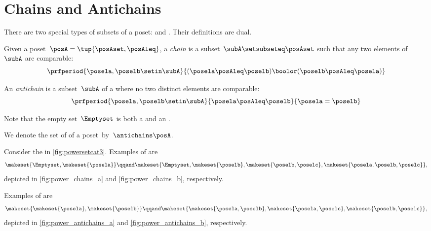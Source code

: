 
\section{Chains and Antichains}
\label{sec:chains-antichains}

There are two special types of subsets of a poset:  and .
Their definitions are dual.

\begin{definition}
    \label{def:chain}
    Given a poset~$\posA = \tup{\posAset, \posAleq}$, a \emph{chain} is a subset~$\subA \setsubseteq \posAset$ such that any two elements of~$\subA$ are comparable:
    \begin{equation}\label{eq:chain}
        \prfperiod{
            \posela,\poselb \setin \subA
        }{
            (\posela \posAleq  \poselb) \boolor (\poselb \posAleq  \posela)
        }
    \end{equation}
\end{definition}

\begin{definition}
    \label{def:antichain}
    An \emph{antichain} is a subset~$\subA$ of a  where no two distinct elements are comparable:
    \begin{equation}\label{eq:antichain}
        \prfperiod{
            \posela, \poselb \setin \subA
        }{
            \posela \posAleq \poselb
        }{
            \posela = \poselb
        }
    \end{equation}
\end{definition}
\begin{remark}
    Note that the empty set~$\Emptyset$ is both a  and an .
\end{remark}

We denote the set of  of a poset~\posA by~$\antichains\posA$.

\begin{example}
    Consider the  in \cref{fig:powersetcat3}.
    Examples of  are
    \begin{equation}\label{eq:example-chain}
        \makeset{\Emptyset,\makeset{\posela}}
        \qqand
        \makeset{\Emptyset,\makeset{\poselb},\makeset{\poselb,\poselc},\makeset{\posela,\poselb,\poselc}},
    \end{equation}
    depicted in \cref{fig:power_chains_a} and \cref{fig:power_chains_b}, respectively.

    Examples of  are
    \begin{equation}\label{eq:examples-antichain}
        \makeset{\makeset{\posela},\makeset{\poselb}}
        \qqand
        \makeset{\makeset{\posela,\poselb}, \makeset{\posela,\poselc}, \makeset{\poselb,\poselc}},
    \end{equation}
    depicted in \cref{fig:power_antichains_a} and \cref{fig:power_antichains_b}, respectively.
\end{example}

